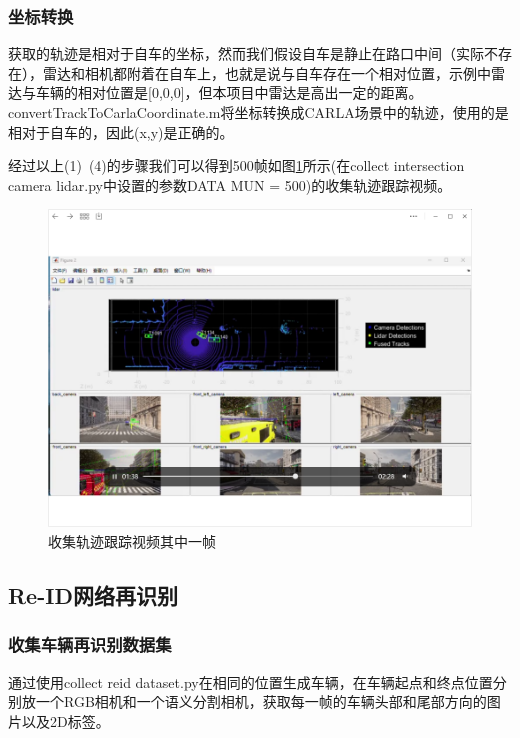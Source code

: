 \subsubsection{坐标转换}
获取的轨迹是相对于自车的坐标，然而我们假设自车是静止在路口中间（实际不存在），雷达和相机都附着在自车上，也就是说与自车存在一个相对位置，示例中雷达与车辆的相对位置是[0,0,0]，但本项目中雷达是高出一定的距离。convertTrackToCarlaCoordinate.m将坐标转换成CARLA场景中的轨迹，使用的是相对于自车的，因此(x,y)是正确的。


经过以上(1)~(4)的步骤我们可以得到500帧如图\ref{fig:p13}所示(在collect intersection camera lidar.py中设置的参数DATA MUN = 500)的收集轨迹跟踪视频。



\begin{figure}[htbp] %
	\centering
	\includegraphics[width=1\textwidth]{p13} %
	\caption{收集轨迹跟踪视频其中一帧} %
	\label{fig:p13} %
\end{figure}







\subsection{Re-ID网络再识别}
\subsubsection{收集车辆再识别数据集}
通过使用collect reid dataset.py在相同的位置生成车辆，在车辆起点和终点位置分别放一个RGB相机和一个语义分割相机，获取每一帧的车辆头部和尾部方向的图片以及2D标签。
